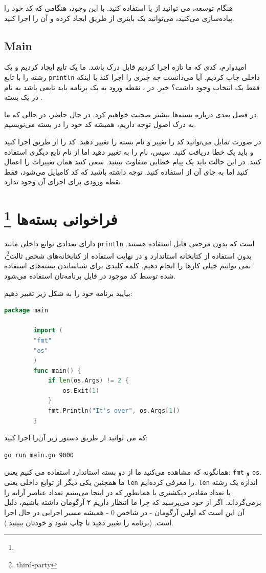 \documentclass{book}
\begin{document}
هنگام توسعه، می توانید از  یا  استفاده کنید. با این وجود، هنگامی که کد خود را پیاده‌سازی می‌کنید، می‌توانید یک باینری از طریق  ایجاد کرده و آن را اجرا کنید.
\subsection{Main}
امیدوارم، کدی که ما تازه اجرا کردیم قابل درک باشد. ما یک تابع ایجاد کردیم و یک رشته را با تابع \verb*|println| داخلی چاپ کردیم. آیا   می‌دانست چه چیزی را اجرا کند با اینکه فقط یک انتخاب وجود داشت؟ خیر. در ، نقطه ورود به یک برنامه باید تابعی باشد به نام  در یک بسته  .

در فصل بعدی درباره بسته‌ها بیشتر صحبت خواهیم کرد. در حال حاضر، در حالی که ما به درک اصول  توجه داریم، همیشه کد خود را در بسته  می‌نویسیم.

در صورت تمایل می‌توانید کد را تغییر و نام بسته را تغییر دهید. کد را از طریق  اجرا کنید و باید یک خطا دریافت کنید. سپس، نام را به  تغییر دهید اما از نام تابع دیگری استفاده کنید. در این حالت باید یک پیام خطایی متفاوت ببینید. سعی کنید همان تغییرات را اعمال کنید اما به جای آن از  استفاده کنید. توجه داشته باشید که کد کامپایل می‌شود، فقط نقطه ورودی برای اجرای آن وجود ندارد.
\newpage
\section{فراخوانی بسته‌ها
\footnote{}}

دارای تعدادی توابع داخلی مانند \verb*|println| است که بدون مرجعی قابل استفاده هستند. بدون استفاده از کتابخانه استاندارد  و در نهایت استفاده از کتابخانه‌های شخص ثالث\footnote{third-party}، نمی توانیم خیلی کارها را انجام دهیم. کلمه کلیدی  برای شناساندن بسته‌های استفاده شده توسط کد موجود در فایل برنامه‌تان استفاده می‌شود.

بیایید برنامه خود را به شکل زیر تغییر دهیم:
\begin{latin}
	\begin{lstlisting}[language=Go]
		package main
		
		import (
		"fmt"
		"os"
		)
		func main() {
			if len(os.Args) != 2 {
				os.Exit(1)
			}
			fmt.Println("It's over", os.Args[1])
		}
	\end{lstlisting}
\end{latin}
که می توانید از طریق دستور زیر آن‌را اجرا کنید:
\begin{latin}
	\begin{lstlisting}[language=bash]
		go run main.go 9000
	\end{lstlisting}
\end{latin}
همانگونه که مشاهده می‌کنید  ما از دو بسته استاندارد  استفاده می کنیم یعنی: \verb*|fmt| و \verb*|os|. ما همچنین یکی دیگر از توابع داخلی یعنی \verb*|len| را معرفی کرده‌ایم. \verb*|len| اندازه یک رشته یا تعداد مقادیر دیکشنری یا همانطور که در اینجا می‌بینیم تعداد عناصر آرایه را برمی‌گرداند. اگر از خود می‌پرسید که چرا ما انتظار داریم ۲ آرگومان داشته باشیم، دلیل آن این است که اولین آرگومان - در شاخص 0 - همیشه مسیر اجرایی در حال اجرا است. (برنامه را تغییر دهید تا چاپ شود و خودتان ببینید.).
\end{document}
